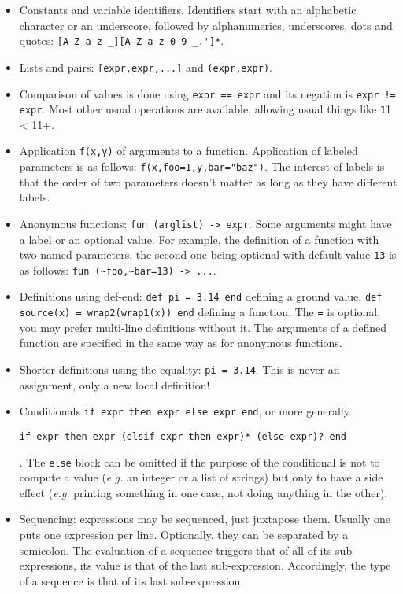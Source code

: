 \begin{itemize}
\item Constants and variable identifiers. Identifiers start with an alphabetic character or an underscore, followed by alphanumerics, underscores, dots and quotes: \verb+[A-Z a-z _][A-Z a-z 0-9 _.']*+.
\item Lists and pairs: \verb+[expr,expr,...]+ and \verb+(expr,expr)+.
\item Comparison of values is done using \verb+expr == expr+ and its negation is \verb+expr != expr+. Most other usual operations are available, allowing usual things like \verb+1+1 < 11+.
\item Application \verb+f(x,y)+ of arguments to a function. Application of labeled parameters is as follows: \verb+f(x,foo=1,y,bar="baz")+. The interest of labels is that the order of two parameters doesn't matter as long as they have different labels.
\item Anonymous functions: \verb+fun (arglist) -> expr+. Some arguments might have a label or an optional value. For example, the definition of a function with two named parameters, the second one being optional with default value \verb+13+ is as follows: \verb+fun (~foo,~bar=13) -> ...+.
\item Definitions using def-end: \verb+def pi = 3.14 end+ defining a ground value, \verb+def source(x) = wrap2(wrap1(x)) end+ defining a function. The \verb+=+ is optional, you may prefer multi-line definitions without it. The arguments of a defined function are specified in the same way as for anonymous functions.
\item Shorter definitions using the equality: \verb+pi = 3.14+. This is never an assignment, only a new local definition!
\item Conditionals \verb+if expr then expr else expr end+, or more generally \begin{verbatim}
if expr then expr (elsif expr then expr)* (else expr)? end
\end{verbatim}
. The \verb+else+ block can be omitted if the purpose of the conditional is not to compute a value (\emph{e.g.} an integer or a list of strings) but only to have a side effect (\emph{e.g.} printing something in one case, not doing anything in the other).
\item Sequencing: expressions may be sequenced, just juxtapose them. Usually one puts one expression per line. Optionally, they can be separated by a semicolon. The evaluation of a sequence triggers that of all of its sub-expressions, its value is that of the last sub-expression. Accordingly, the type of a sequence is that of its last sub-expression.

\end{itemize}
